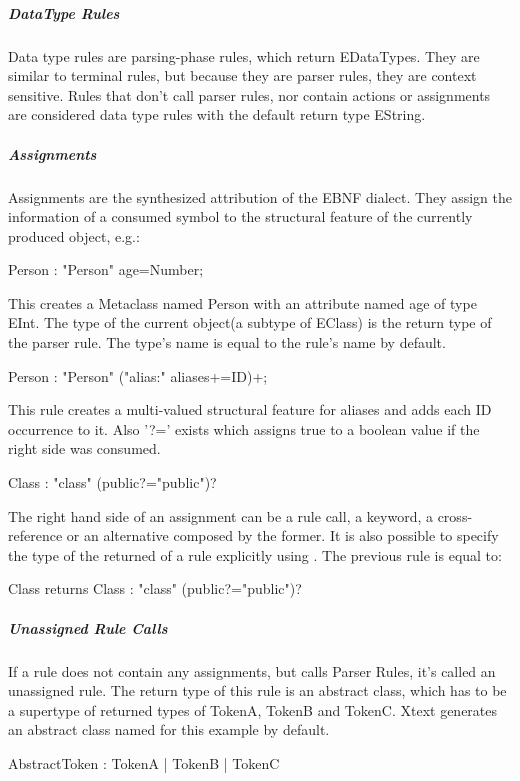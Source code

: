 \subparagraph{DataType Rules}
Data type  rules are parsing-phase rules, which return EDataTypes. They are similar to terminal rules, but because they are parser rules, they are context sensitive. Rules that don't call  parser rules, nor contain actions or assignments are considered data type rules with the default return type EString. 
\begin{xtxt}
Number returns ecore::EInt : NUM ('.' NUM*)?;}
\end{xtxt}

\subparagraph{Assignments}
Assignments are the synthesized attribution of the EBNF dialect. They assign the information of a consumed symbol to the structural feature of the currently produced object, e.g.:
\begin{xtxt}
Person : "Person" age=Number;
\end{xtxt}
This creates a Metaclass named Person with an attribute named age of type EInt. 
The type of the current object(a subtype of EClass) is the return type of the parser rule. The type's name is equal to the rule's name by default.
\begin{xtxt}
Person : "Person" ("alias:" aliases+=ID)+;
\end{xtxt}
This rule creates a multi-valued structural feature for aliases and adds each ID occurrence to it. Also '?=' exists which assigns true to a boolean value if the right side was consumed.
\begin{xtxt}
Class : "class" (public?="public")?
\end{xtxt}
The right hand side of an assignment can be a rule call, a keyword, a cross-reference or an alternative composed by the former. It is also possible to specify the type of the returned  of a rule explicitly using . The previous rule is equal to:
\begin{xtxt}
Class returns Class : "class" (public?="public")?
\end{xtxt}

\subparagraph{Unassigned Rule Calls}
If a rule does not contain any assignments, but calls Parser Rules, it's called an unassigned rule. The return type of this rule is an abstract class, which has to be a supertype of returned types of TokenA, TokenB and TokenC. Xtext generates an abstract class named  for this example by default.
\begin{xtxt}
AbstractToken :	TokenA |	TokenB |	TokenC
\end{xtxt}



